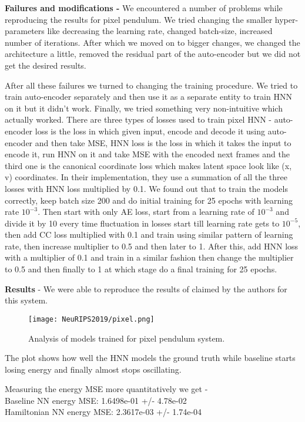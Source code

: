 \documentclass{article}
\begin{document}
\textbf{Failures and modifications -} We encountered a number of problems while reproducing the results for pixel pendulum. We tried changing the smaller hyper-parameters like decreasing the learning rate, changed batch-size, increased number of iterations. After which we moved on to bigger changes, we changed the architecture a little, removed the residual part of the auto-encoder but we did not get the desired results.

After all these failures we turned to changing the training procedure. We tried to train auto-encoder separately and then use it as a separate entity to train HNN on it but it didn't work. Finally, we tried something very non-intuitive which actually worked. There are three types of losses used to train pixel HNN - auto-encoder loss is the loss in which given input, encode and decode it using auto-encoder and then take MSE, HNN loss is the loss in which it takes the input to encode it, run HNN on it and take MSE with the encoded next frames and the third one is the canonical coordinate loss which makes latent space look like (x, v) coordinates. In their implementation, they use a summation of all the three losses with HNN loss multiplied by 0.1. We found out that to train the models correctly, keep batch size 200 and do initial training for 25 epochs with learning rate \(10^{-3}\). Then start with only AE loss, start from a learning rate of \(10^{-3}\) and divide it by 10 every time fluctuation in losses start till learning rate gets to \(10^{-5}\), then add CC loss multiplied with 0.1 and train using similar pattern of learning rate, then increase multiplier to 0.5 and then later to 1. After this, add HNN loss with a multiplier of 0.1 and train in a similar fashion then change the multiplier to 0.5 and then finally to 1 at which stage do a final training for 25 epochs.

\textbf{Results} - We were able to reproduce the results of claimed by the authors for this system.
\begin{figure}[htp]
    \centering
    \texttt{[image: NeuRIPS2019/pixel.png]}
    \caption{Analysis of models trained for pixel pendulum system.}
    \label{fig:galaxy}
\end{figure}

The plot shows how well the HNN models the ground truth while baseline starts losing energy and finally almost stops oscillating.

Measuring the energy MSE more quantitatively we get -\\
Baseline NN energy MSE: 1.6498e-01 +/- 4.78e-02\\
Hamiltonian NN energy MSE: 2.3617e-03 +/- 1.74e-04
\end{document}
